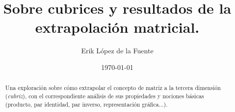 \documentclass[a4paper, titlepage]{article}
\title{Sobre cubrices y resultados de la extrapolación matricial.}
\author{Erik López de la Fuente}
\date{\today}
\begin{document}
\maketitle

\begin{abstract}
	Una exploración sobre cómo extrapolar el concepto de matriz a la tercera dimensión (\textit{cubriz}), con el correspondiente análisis de sus propiedades y nociones básicas (producto, par identidad, par inverso, representación gráfica...).
\end{abstract}

\tableofcontents
\newpage


\newpage


\end{document}

